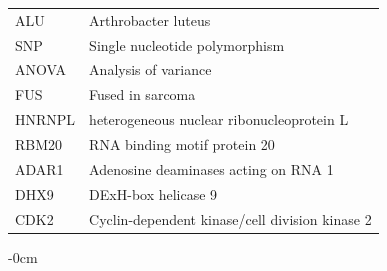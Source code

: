 \documentclass[journal,review,submit,pdftex,moreauthors]{Definitions/mdpi}
\begin{document}
{\begin{tabular}{@{}ll}
ALU & Arthrobacter luteus \\
SNP & Single nucleotide polymorphism \\
ANOVA & Analysis of variance \\
FUS & Fused in sarcoma \\
HNRNPL & heterogeneous nuclear ribonucleoprotein L \\
RBM20 & RNA binding motif protein 20 \\
ADAR1 & Adenosine deaminases acting on RNA 1 \\
DHX9 & DExH-box helicase 9 \\
CDK2 & Cyclin-dependent kinase/cell division kinase 2
\end{tabular}
}


\begin{adjustwidth}{-\extralength}{0cm}






%


\PublishersNote{}
\end{adjustwidth}
\end{document}
